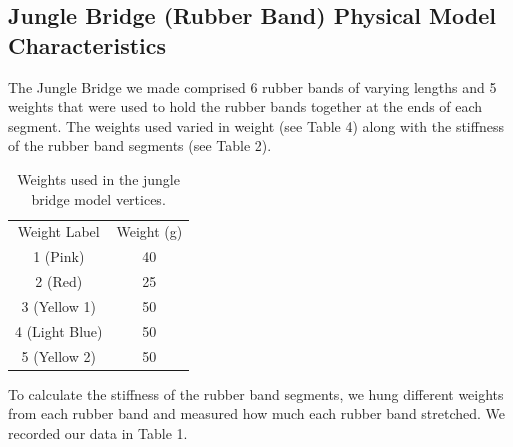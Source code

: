 \documentclass[10pt,letterpaper,onecolumn,report]{tau-class/tau}
\begin{document}
    \subsection{Jungle Bridge (Rubber Band) Physical Model Characteristics}

        The Jungle Bridge we made comprised 6 rubber bands of varying lengths and 5 weights that were used to hold the rubber bands together at the ends of each segment. The weights used varied in weight (see Table 4) along with the stiffness of the rubber band segments (see Table 2).

        \begin{table}[H]
            \centering
            \setcounter{table}{3} %
            \begin{tabular}{cc}
                 Weight Label & Weight (g)\\
                 1 (Pink) & 40\\
                 2 (Red) & 25\\
                 3 (Yellow 1) & 50\\
                 4 (Light Blue) & 50\\
                 5 (Yellow 2) & 50\\
            \end{tabular}
            \caption{Weights used in the jungle bridge model vertices.}
            \label{tab:4}
        \end{table}

        To calculate the stiffness of the rubber band segments, we hung different weights from each rubber band and measured how much each rubber band stretched. We recorded our data in Table 1.
\end{document}
